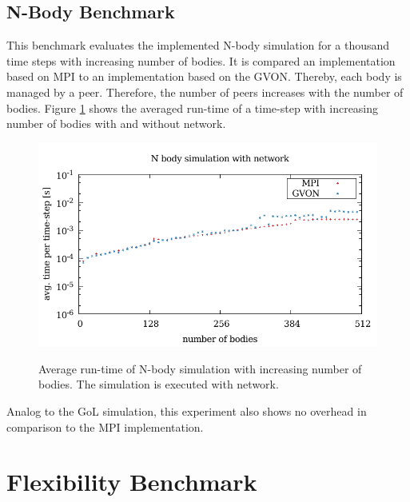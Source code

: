 \subsection{N-Body Benchmark}
This benchmark evaluates the implemented N-body simulation for a
thousand time steps with increasing number of bodies. It is compared
an implementation based on MPI to an implementation based on the GVON.
Thereby, each body is managed by a peer. Therefore, the number of
peers increases with the number of bodies. Figure
\ref{fig:nbody_laser} shows the averaged run-time of a time-step with
increasing number of bodies with and without network.

\begin{figure}[H]
  \includegraphics[width=\textwidth]{plots/50_nbody_network_laser}
  \label{fig:nbody_laser}
  \caption{Average run-time of N-body simulation with increasing
    number of bodies. The simulation is executed with network.}
\end{figure}

Analog to the GoL simulation, this experiment also shows no overhead
in comparison to the MPI implementation.

\section{Flexibility Benchmark}

